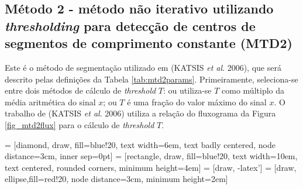 \subsection{Método 2 - método não iterativo utilizando \emph{thresholding} para detecção de centros de segmentos de comprimento constante (MTD2)}

Este é o método de segmentação utilizado em (KATSIS \emph{et al}. 2006), que será descrito pelas definições da Tabela \ref{tab:mtd2params}. Primeiramente, seleciona-se entre dois métodos de cálculo de \emph{threshold} $T$: ou utiliza-se $T$ como múltiplo da média aritmética do sinal $x$; ou $T$ é uma fração do valor máximo do sinal $x$. O trabalho de (KATSIS \emph{et al}. 2006) utiliza a relação do fluxograma da Figura \ref{fig_mtd2flux} para o cálculo de \emph{threshold} $T$.

\begin{table}[htb]
\end{table}

 = [diamond, draw, fill=blue!20, 
    text width=6em, text badly centered, node distance=3cm, inner sep=0pt]
 = [rectangle, draw, fill=blue!20, 
    text width=10em, text centered, rounded corners, minimum height=4em]
 = [draw, -latex']
 = [draw, ellipse,fill=red!20, node distance=3cm,
    minimum height=2em]

